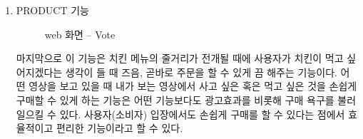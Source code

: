 \begin{enumerate}
\begin{enumerate}
        \item PRODUCT 기능
        
        \begin{figure}[h!]
            \centering
            \caption{web 화면 – Vote}
        \end{figure} 

    마지막으로 이 기능은 치킨 메뉴의 줄거리가 전개될 때에 사용자가 치킨이 먹고 싶어지겠다는 생각이 들 때 즈음, 곧바로 주문을 할 수 있게 끔 해주는 기능이다. 어떤 영상을 보고 있을 때 내가 보는 영상에서 사고 싶은 혹은 먹고 싶은 것을 손쉽게 구매할 수 있게 하는 기능은 어떤 기능보다도 광고효과를 비롯해 구매 욕구를 불러일으킬 수 있다. 사용자(소비자) 입장에서도 손쉽게 구매를 할 수 있다는 점에서 효율적이고 편리한 기능이라고 할 수 있다.
    \end{enumerate}
\end{enumerate}

